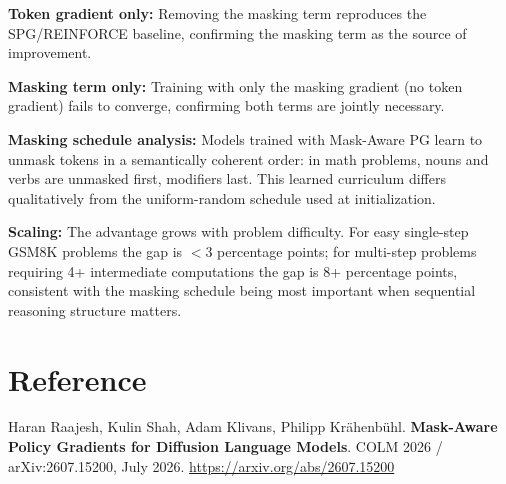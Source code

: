 \documentclass[10pt,twocolumn]{article}
\begin{document}
\textbf{Token gradient only:} Removing the masking term
reproduces the SPG/REINFORCE baseline, confirming the masking
term as the source of improvement.

\textbf{Masking term only:} Training with only the masking
gradient (no token gradient) fails to converge, confirming
both terms are jointly necessary.

\textbf{Masking schedule analysis:} Models trained with
Mask-Aware PG learn to unmask tokens in a semantically
coherent order: in math problems, nouns and verbs are
unmasked first, modifiers last. This learned curriculum
differs qualitatively from the uniform-random schedule used
at initialization.

\textbf{Scaling:} The advantage grows with problem difficulty.
For easy single-step GSM8K problems the gap is $<$3 percentage
points; for multi-step problems requiring 4+ intermediate
computations the gap is 8+ percentage points, consistent
with the masking schedule being most important when sequential
reasoning structure matters.

\section*{Reference}

Haran Raajesh, Kulin Shah, Adam Klivans, Philipp Kr\"{a}henb\"{u}hl.
\textbf{Mask-Aware Policy Gradients for Diffusion Language Models}.
COLM 2026 / arXiv:2607.15200, July 2026.
\url{https://arxiv.org/abs/2607.15200}
\end{document}
